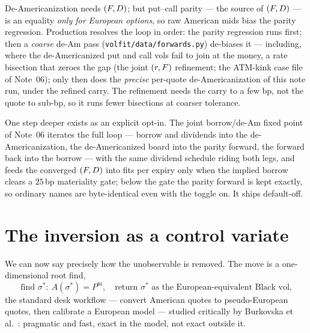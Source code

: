 \documentclass[11pt]{article}
\begin{document}
\begin{remark}
\label{rem:circular}
De-Americanization needs $(F,D)$; but put--call parity --- the source
of $(F,D)$ --- is an equality \emph{only for European options}, so raw
American mids bias the parity regression.  Production resolves the loop in
order: the parity regression runs first; then a \emph{coarse} de-Am pass
(\texttt{volfit/data/forwards.py}) de-biases it --- including, where the
de-Americanized put and call vols fail to join at the money, a rate
bisection that zeroes the gap (the joint $(r,F)$ refinement; the
ATM-kink case file of Note~06); only then does the \emph{precise}
per-quote de-Americanization of this note run, under the refined carry.
The refinement needs the carry to a few bp, not the quote to sub-bp, so it
runs fewer bisections at coarser tolerance.

One step deeper exists as an explicit opt-in.  The joint borrow/de-Am
fixed point of Note~06 iterates the full loop --- borrow and dividends
into the de-Americanization, the de-Americanized board into the parity
forward, the forward back into the borrow --- with the same dividend
schedule riding both legs, and feeds the converged $(F,D)$ into fits
per expiry only when the implied borrow clears a $25$\,bp materiality
gate; below the gate the parity forward is kept exactly, so ordinary
names are byte-identical even with the toggle on.  It ships default-off.
\end{remark}

\section{The inversion as a control variate}
\label{sec:cv}

We can now say precisely how the unobservable is removed.  The move is a
one-dimensional root find,
\begin{equation}
\boxed{\;\text{find }\sigma^*:\ A(\sigma^*)=P^{\mathrm m},\quad
\text{return }\sigma^*\text{ as the European-equivalent Black vol,}\;}
\label{eq:deam}
\end{equation}
the standard desk workflow --- convert American quotes to pseudo-European
quotes, then calibrate a European model --- studied critically by
Burkovska et al.~\cite{Burkovska2018}: pragmatic and fast, exact in the
model, not exact outside it.
\end{document}
